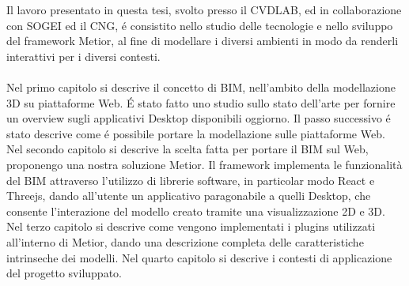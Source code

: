 
Il lavoro presentato in questa tesi, svolto presso il CVDLAB, ed in collaborazione con SOGEI ed il CNG,
 \'e consistito nello studio delle tecnologie e nello sviluppo del framework Metior,
al fine di modellare i diversi ambienti in modo da renderli interattivi per i diversi contesti.\\
\\
Nel primo capitolo si descrive il concetto di BIM,
nell'ambito della modellazione 3D su piattaforme Web. \'E stato fatto uno studio sullo stato dell'arte
per fornire un overview sugli applicativi Desktop disponibili oggiorno.
Il passo successivo \'e stato descrive come \'e possibile portare la modellazione sulle piattaforme Web.
Nel secondo capitolo si descrive la scelta fatta per portare il BIM sul Web, proponengo una nostra soluzione Metior.
Il framework implementa le funzionalit\`a del BIM attraverso l'utilizzo di librerie software,
in particolar modo React e Threejs, dando all'utente un applicativo paragonabile a quelli
Desktop, che consente l'interazione del modello creato tramite una visualizzazione 2D e 3D.
Nel terzo capitolo si descrive come vengono implementati i plugins utilizzati all'interno di Metior,
dando una descrizione completa delle caratteristiche intrinseche dei modelli.
Nel quarto capitolo si descrive i contesti di applicazione del progetto sviluppato.
